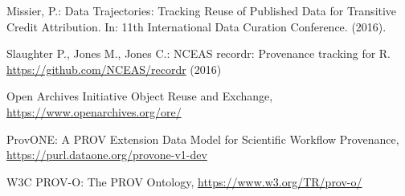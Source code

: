 \documentclass[a4paper]{llncs}
\begin{document}
\begin{thebibliography}{4}
 Missier, P.: Data Trajectories: Tracking Reuse of Published Data for Transitive Credit Attribution. In: 11th International Data Curation Conference. (2016). 

 Slaughter P., Jones M., Jones C.: NCEAS recordr: Provenance tracking for R. \url{https://github.com/NCEAS/recordr} (2016)

 Open Archives Initiative Object Reuse and Exchange, \url{https://www.openarchives.org/ore/}

 ProvONE: A PROV Extension Data Model for Scientific Workflow Provenance, \url{https://purl.dataone.org/provone-v1-dev}

 W3C PROV-O: The PROV Ontology, \url{https://www.w3.org/TR/prov-o/}



\end{thebibliography}
\end{document}
